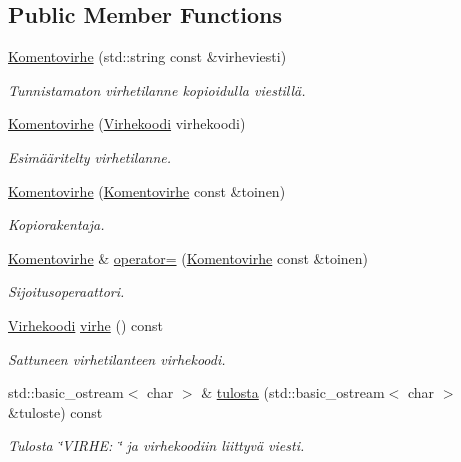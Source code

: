 \subsection*{Public Member Functions}
\begin{DoxyCompactItemize}
\item 
\hyperlink{class_julkinen_1_1_komentovirhe_a1247b5f9cf1f6d4aa59baa8384e0112e}{Komentovirhe} (std\+::string const \&virheviesti)
\begin{DoxyCompactList}\small\item\em Tunnistamaton virhetilanne kopioidulla viestillä. \end{DoxyCompactList}\item 
\hyperlink{class_julkinen_1_1_komentovirhe_ab1ef7899e248fb500629cce56633c556}{Komentovirhe} (\hyperlink{class_julkinen_1_1_komentovirhe_ad45b4895d16e53f115875f2e2a1518e3}{Virhekoodi} virhekoodi)
\begin{DoxyCompactList}\small\item\em Esimääritelty virhetilanne. \end{DoxyCompactList}\item 
\hyperlink{class_julkinen_1_1_komentovirhe_a821c0e04a608cb5d8a137df0c7a4327c}{Komentovirhe} (\hyperlink{class_julkinen_1_1_komentovirhe}{Komentovirhe} const \&toinen)
\begin{DoxyCompactList}\small\item\em Kopiorakentaja. \end{DoxyCompactList}\item 
\hyperlink{class_julkinen_1_1_komentovirhe}{Komentovirhe} \& \hyperlink{class_julkinen_1_1_komentovirhe_af734e3e8cf75a93652020efb15420def}{operator=} (\hyperlink{class_julkinen_1_1_komentovirhe}{Komentovirhe} const \&toinen)
\begin{DoxyCompactList}\small\item\em Sijoitusoperaattori. \end{DoxyCompactList}\item 
\hypertarget{class_julkinen_1_1_komentovirhe_a1b92df0f5dce8cec701f7f99801a5b1c}{}\hyperlink{class_julkinen_1_1_komentovirhe_ad45b4895d16e53f115875f2e2a1518e3}{Virhekoodi} \hyperlink{class_julkinen_1_1_komentovirhe_a1b92df0f5dce8cec701f7f99801a5b1c}{virhe} () const \label{class_julkinen_1_1_komentovirhe_a1b92df0f5dce8cec701f7f99801a5b1c}

\begin{DoxyCompactList}\small\item\em Sattuneen virhetilanteen virhekoodi. \end{DoxyCompactList}\item 
\hypertarget{class_julkinen_1_1_komentovirhe_a51d6d273b79074b6c8ea8d0b1ef2fe65}{}std\+::basic\+\_\+ostream$<$ char $>$ \& \hyperlink{class_julkinen_1_1_komentovirhe_a51d6d273b79074b6c8ea8d0b1ef2fe65}{tulosta} (std\+::basic\+\_\+ostream$<$ char $>$ \&tuloste) const \label{class_julkinen_1_1_komentovirhe_a51d6d273b79074b6c8ea8d0b1ef2fe65}

\begin{DoxyCompactList}\small\item\em Tulosta \char`\"{}\+V\+I\+R\+H\+E\+: \char`\"{} ja virhekoodiin liittyvä viesti. \end{DoxyCompactList}\end{DoxyCompactItemize}
